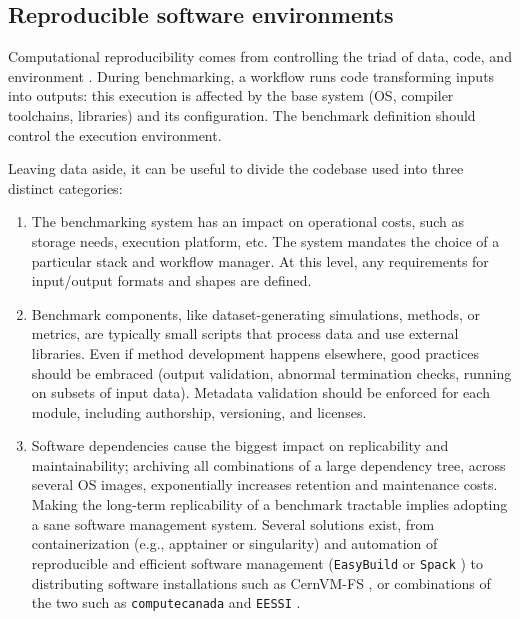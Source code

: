 \documentclass[11pt]{article}
\begin{document}
\subsection*{Reproducible software environments}

Computational reproducibility comes from controlling the triad of data, code, and environment \cite{Hill2024-gf}. During benchmarking, a workflow runs code transforming inputs into outputs: this execution is affected by the base system (OS, compiler toolchains, libraries) and its configuration. The benchmark definition should control the execution environment.

Leaving data aside, it can be useful to divide the codebase used into three distinct categories:

\begin{enumerate}
\item The benchmarking system has an impact on operational costs, such as storage needs, execution platform, etc.  The system mandates the choice of a particular stack and workflow manager. At this level, any requirements for input/output formats and shapes are defined.

\item Benchmark components, like dataset-generating simulations, methods, or metrics, are typically small scripts that process data and use external libraries. Even if method development happens elsewhere, good practices should be embraced (output validation, abnormal termination checks, running on subsets of input data).  Metadata validation should be enforced for each module, including authorship, versioning, and licenses.

\item Software dependencies cause the biggest impact on replicability and maintainability; archiving all combinations of a large dependency tree, across several OS images, exponentially increases retention and maintenance costs. Making the long-term replicability of a benchmark tractable implies adopting a sane software management system. Several solutions exist, from containerization (e.g., apptainer or singularity) \cite{Kurtzer2017-mn} and automation of reproducible and efficient software management (\texttt{EasyBuild} \cite{Hoste2012-gg} or \texttt{Spack} \cite{Gamblin2015-ll}) to distributing software installations such as CernVM-FS \cite{Blomer2013-jk},  or combinations of the two such as \texttt{computecanada} \cite{Boissonneault2019-wm} and \texttt{EESSI} \cite{Droge2023-ax}.

\end{enumerate}
\end{document}
